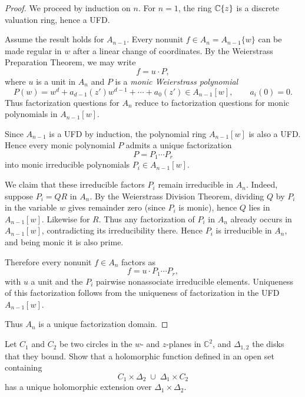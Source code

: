 \documentclass[12pt]{article}
\begin{document}
\begin{proof}
We proceed by induction on $n$. For $n=1$, the ring $\mathbb{C}\{z\}$ is a
discrete valuation ring, hence a UFD.

Assume the result holds for $A_{n-1}$. Every nonunit $f\in A_n =
A_{n-1}\{w\}$ can be made regular in $w$ after a linear change of
coordinates. By the Weierstrass Preparation Theorem, we may write
\[
f = u \cdot P,
\]
where $u$ is a unit in $A_n$ and $P$ is a \emph{monic Weierstrass
polynomial}
\[
P(w) = w^d + a_{d-1}(z') w^{d-1} + \cdots + a_0(z') \in A_{n-1}[w],
\qquad a_i(0)=0.
\]
Thus factorization questions for $A_n$ reduce to factorization questions
for monic polynomials in $A_{n-1}[w]$.

Since $A_{n-1}$ is a UFD by induction, the polynomial ring
$A_{n-1}[w]$ is also a UFD. Hence every monic polynomial $P$ admits a
unique factorization
\[
P = P_1 \cdots P_r
\]
into monic irreducible polynomials $P_i \in A_{n-1}[w]$.

We claim that these irreducible factors $P_i$ remain irreducible in
$A_n$. Indeed, suppose $P_i = QR$ in $A_n$. By the Weierstrass Division
Theorem, dividing $Q$ by $P_i$ in the variable $w$ gives remainder zero
(since $P_i$ is monic), hence $Q$ lies in $A_{n-1}[w]$. Likewise for $R$.
Thus any factorization of $P_i$ in $A_n$ already occurs in
$A_{n-1}[w]$, contradicting its irreducibility there. Hence $P_i$ is
irreducible in $A_n$, and being monic it is also prime.

Therefore every nonunit $f\in A_n$ factors as
\[
f = u \cdot P_1\cdots P_r,
\]
with $u$ a unit and the $P_i$ pairwise nonassociate irreducible elements.
Uniqueness of this factorization follows from the uniqueness of
factorization in the UFD $A_{n-1}[w]$.

Thus $A_n$ is a unique factorization domain.
\end{proof}

\begin{exercise}\label{ex:codim-2-extn}
Let $C_1$ and $C_2$ be two circles in the $w$- and $z$-planes in $\mathbb{C}^2$, and $\Delta_{1,2}$ the disks that they bound. Show that a holomorphic function defined in an open set containing
\[
    C_1 \times \Delta_2 \;\cup\; \Delta_1 \times C_2
\]
has a unique holomorphic extension over $\Delta_1 \times \Delta_2$.
\end{exercise}
\end{document}
